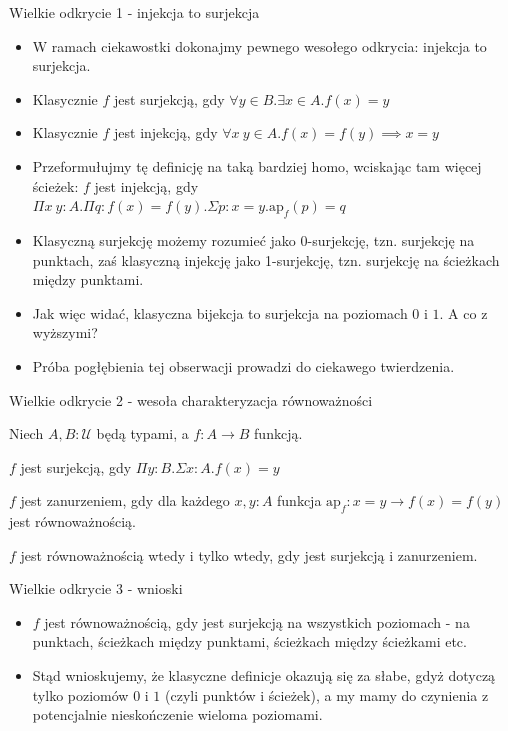 \documentclass{beamer}
\newcommand{\U}{\mathcal{U}}
\newcommand{\ap}[2]{\text{ap}_{#1}(#2)}
\begin{document}
\begin{frame}{Wielkie odkrycie 1 - injekcja to surjekcja}
\begin{itemize}
	\item W ramach ciekawostki dokonajmy pewnego wesołego odkrycia: injekcja to surjekcja.
	\item Klasycznie $f$ jest surjekcją, gdy $\forall y \in B. \exists x \in A. f(x) = y$
	\item Klasycznie $f$ jest injekcją, gdy $\forall x\ y \in A. f(x) = f(y) \implies x = y$
	\item Przeformułujmy tę definicję na taką bardziej homo, wciskając tam więcej ścieżek: $f$ jest injekcją, gdy $\Pi x\ y : A. \Pi q : f(x) = f(y). \Sigma p : x = y. \ap{f}{p} = q$
	\item Klasyczną surjekcję możemy rozumieć jako 0-surjekcję, tzn. surjekcję na punktach, zaś klasyczną injekcję jako 1-surjekcję, tzn. surjekcję na ścieżkach między punktami.
	\item Jak więc widać, klasyczna bijekcja to surjekcja na poziomach $0$ i $1$. A co z wyższymi?
	\item Próba pogłębienia tej obserwacji prowadzi do ciekawego twierdzenia.
\end{itemize}
\end{frame}

\begin{frame}{Wielkie odkrycie 2 - wesoła charakteryzacja równoważności}

Niech $A, B : \U$ będą typami, a $f: A \to B$ funkcją.

\begin{definition}
$f$ jest surjekcją, gdy $\Pi y : B. \Sigma x : A. f(x) = y$
\end{definition}

\begin{definition}[Zanurzenie]
$f$ jest zanurzeniem, gdy dla każdego $x, y : A$ funkcja $\text{ap}_f : x = y \to f(x) = f(y)$ jest równoważnością.
\end{definition}

\begin{theorem}
$f$ jest równoważnością wtedy i tylko wtedy, gdy jest surjekcją i zanurzeniem.
\end{theorem}

\end{frame}

\begin{frame}{Wielkie odkrycie 3 - wnioski}
\begin{itemize}
	\item $f$ jest równoważnością, gdy jest surjekcją na wszystkich poziomach - na punktach, ścieżkach między punktami, ścieżkach między ścieżkami etc.
	\item Stąd wnioskujemy, że klasyczne definicje okazują się za słabe, gdyż dotyczą tylko poziomów $0$ i $1$ (czyli punktów i ścieżek), a my mamy do czynienia z potencjalnie nieskończenie wieloma poziomami.
\end{itemize}
\end{frame}
\end{document}
